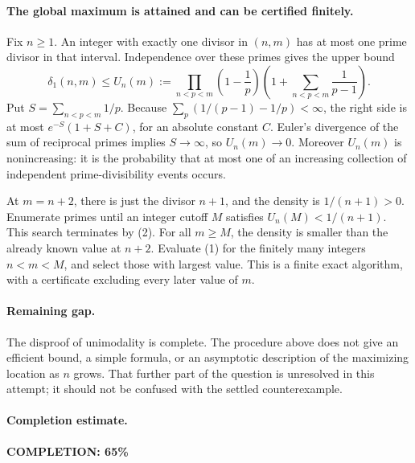 \paragraph{The global maximum is attained and can be certified finitely.}
Fix \(n\geq1\). An integer with exactly one divisor in \((n,m)\)
has at most one prime divisor in that interval. Independence
over these primes gives the upper bound
\[
 \delta_1(n,m)\leq U_n(m):=
 \prod_{n<p<m}\left(1-\frac1p\right)
 \left(1+\sum_{n<p<m}\frac1{p-1}\right).                         \tag{2}
\]
Put \(S=\sum_{n<p<m}1/p\). Because
\(\sum_p(1/(p-1)-1/p)<\infty\), the right side is at most
\(e^{-S}(1+S+C)\), for an absolute constant \(C\).
Euler's divergence of the sum of reciprocal primes implies
\(S\longrightarrow\infty\), so \(U_n(m)\longrightarrow0\).
Moreover \(U_n(m)\) is nonincreasing: it is the probability
that at most one of an increasing collection of independent
prime-divisibility events occurs.

At \(m=n+2\), there is just the divisor \(n+1\), and the density
is \(1/(n+1)>0\). Enumerate primes until an integer cutoff \(M\)
satisfies \(U_n(M)<1/(n+1)\). This search terminates by (2).
For all \(m\geq M\), the density is smaller than the already
known value at \(n+2\). Evaluate (1) for the finitely many
integers \(n<m<M\), and select those with largest value.
This is a finite exact algorithm, with a certificate excluding
every later value of \(m\).

\paragraph{Remaining gap.}
The disproof of unimodality is complete. The procedure above
does not give an efficient bound, a simple formula, or an
asymptotic description of the maximizing location as \(n\) grows.
That further part of the question is unresolved in this attempt;
it should not be confused with the settled counterexample.

\paragraph{Completion estimate.}
\textbf{COMPLETION: 65\%}
